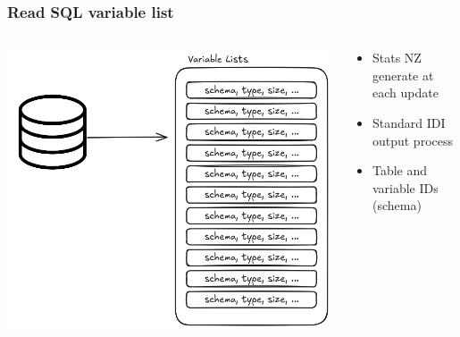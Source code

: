 \documentclass[aspectratio=169]{beamer}
\begin{document}
\begin{frame}
    \frametitle{Read SQL variable list}

    \begin{columns}
        \begin{column}{0.5\textwidth}
            \begin{center}
                \includegraphics[width=0.8\linewidth]{dd-sql.png}
            \end{center}
        \end{column}
        \begin{column}{0.5\textwidth}
            \begin{itemize}
                \item Stats NZ generate at each update
                \item Standard IDI output process
                \item Table and variable IDs (schema)
            \end{itemize}
        \end{column}
    \end{columns}

\end{frame}
\end{document}
